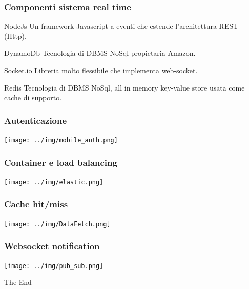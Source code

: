 \documentclass{beamer}
\begin{document}

\begin{frame}
\frametitle{Componenti sistema real time}
\begin{block}{NodeJs}
Un framework Javascript a eventi che estende l'architettura REST (Http). 
\end{block}

\begin{block}{DynamoDb}
Tecnologia di DBMS NoSql propietaria Amazon.
\end{block}

\begin{block}{Socket.io}
Libreria molto flessibile che implementa web-socket.
\end{block}

\begin{block}{Redis}
Tecnologia di DBMS NoSql, all in memory key-value store usata come cache di supporto.
\end{block}
\end{frame}





\begin{frame}
\frametitle{Autenticazione}
\centerline{\texttt{[image: ../img/mobile\_auth.png]}}
\end{frame}


\begin{frame}
\frametitle{Container e load balancing}
\centerline{\texttt{[image: ../img/elastic.png]}}
\end{frame}


\begin{frame}
\frametitle{Cache hit/miss}
\centerline{\texttt{[image: ../img/DataFetch.png]}}
\end{frame}



\begin{frame}
\frametitle{Websocket notification}
\centerline{\texttt{[image: ../img/pub\_sub.png]}}
\end{frame}




\begin{frame}
\Huge{\centerline{The End}}
\end{frame}

\end{document}

